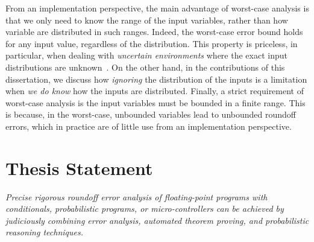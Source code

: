 %
From an implementation perspective, the main advantage of worst-case analysis is that we only need to know the range of the input variables, rather than how variable are distributed in such ranges. 
%
Indeed, the worst-case error bound holds for any input value, regardless of the distribution.
%
%
This property is priceless, in particular, when dealing with \emph{uncertain environments} where the exact input distributions are unknown~\cite{robotrisk}.
%
On the other hand, in the contributions of this dissertation, we discuss how \emph{ignoring} the distribution of the inputs is a limitation when \emph{we do know} how the inputs are distributed.
%
Finally, a strict requirement of worst-case analysis is the input variables must be bounded  in a finite range. This is because, in the worst-case, unbounded variables lead to unbounded roundoff errors, which in practice are of little use from an implementation perspective.
%
\section{Thesis Statement}
%

%
\emph{
Precise rigorous roundoff error analysis of floating-point programs with conditionals, probabilistic programs, or micro-controllers can be achieved by judiciously combining error analysis, automated theorem proving, and probabilistic reasoning techniques.
%
%	
%
%
%
%
%
}


